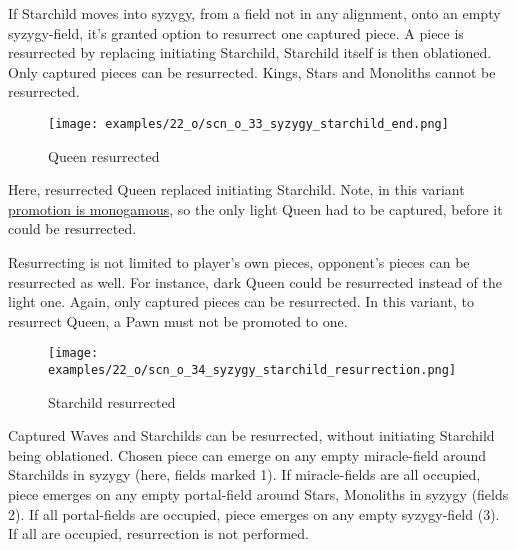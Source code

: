 If Starchild moves into syzygy, from a field not in any alignment, onto an empty
syzygy-field, it's granted option to resurrect one captured piece. A piece is
resurrected by replacing initiating Starchild, Starchild itself is then oblationed.
Only captured pieces can be resurrected. Kings, Stars and Monoliths cannot be
resurrected.

\clearpage %

\vspace*{-2.1\baselineskip}
\noindent
\begin{figure}[!h]
\texttt{[image: examples/22\_o/scn\_o\_33\_syzygy\_starchild\_end.png]}
\vspace*{-1.4\baselineskip}
\caption{Queen resurrected}
\label{fig:scn_o_33_syzygy_starchild_end}
\end{figure}

\vspace*{-0.3\baselineskip}
Here, resurrected Queen replaced initiating Starchild. Note, in this variant
\hyperref[sec:One/Promotion]{promotion is monogamous}, so the only light Queen
had to be captured, before it could be resurrected.

Resurrecting is not limited to player's own pieces, opponent's pieces can be
resurrected as well. For instance, dark Queen could be resurrected instead of
the light one. Again, only captured pieces can be resurrected. In this variant,
to resurrect Queen, a Pawn must not be promoted to one.

\clearpage %

\vspace*{-2.1\baselineskip}
\noindent
\begin{figure}[!h]
\texttt{[image: examples/22\_o/scn\_o\_34\_syzygy\_starchild\_resurrection.png]}
\caption{Starchild resurrected}
\label{fig:scn_o_34_syzygy_starchild_resurrection}
\end{figure}

Captured Waves and Starchilds can be resurrected, without initiating Starchild
being oblationed. Chosen piece can emerge on any empty miracle-field around
Starchilds in syzygy (here, fields marked 1). If miracle-fields are all
occupied, piece emerges on any empty portal-field around Stars, Monoliths in
syzygy (fields 2). If all portal-fields are occupied, piece emerges on any
empty syzygy-field (3). If all are occupied, resurrection is not performed.

